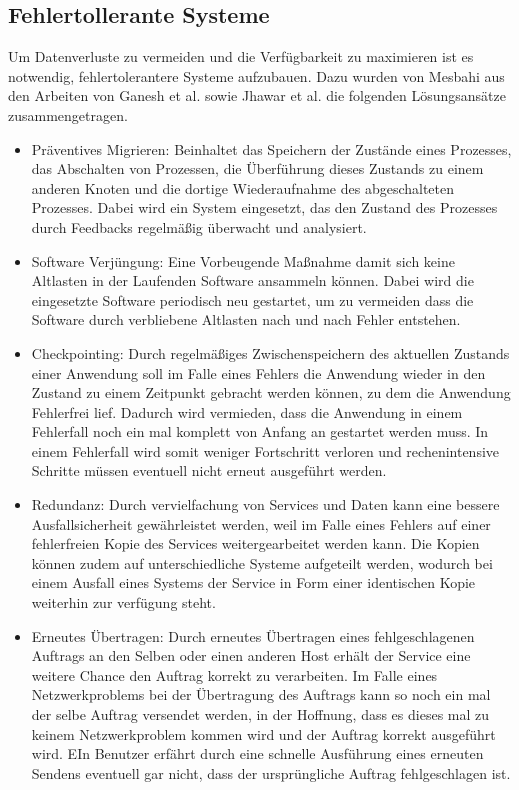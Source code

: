 \subsection{Fehlertollerante Systeme}
Um Datenverluste zu vermeiden und die Verfügbarkeit zu maximieren ist es notwendig, fehlertolerantere Systeme aufzubauen. Dazu wurden von Mesbahi \cite{mesbahi2018} aus den Arbeiten von Ganesh et al. \cite{ganesh2014} sowie Jhawar et al. \cite{jhawar2013} die folgenden Lösungsansätze zusammengetragen.

\begin{itemize}
\item
Präventives Migrieren: Beinhaltet das Speichern der Zustände eines Prozesses, das Abschalten von Prozessen, die Überführung dieses Zustands zu einem anderen Knoten und die dortige Wiederaufnahme des abgeschalteten Prozesses.
Dabei wird ein System eingesetzt, das den Zustand des Prozesses durch Feedbacks regelmäßig überwacht und analysiert. 
\item
Software Verjüngung: Eine Vorbeugende Maßnahme damit sich keine Altlasten in der Laufenden Software ansammeln können. Dabei wird die eingesetzte Software periodisch neu gestartet, um zu vermeiden dass die Software durch verbliebene Altlasten nach und nach Fehler entstehen.
\item
Checkpointing: Durch regelmäßiges Zwischenspeichern des aktuellen Zustands einer Anwendung soll im Falle eines Fehlers die Anwendung wieder in den Zustand zu einem Zeitpunkt gebracht werden können, zu dem die Anwendung Fehlerfrei lief. Dadurch wird vermieden, dass die Anwendung in einem Fehlerfall noch ein mal komplett von Anfang an gestartet werden muss. In einem Fehlerfall wird somit weniger Fortschritt verloren und rechenintensive Schritte müssen eventuell nicht erneut ausgeführt werden.
\item
Redundanz: Durch vervielfachung von Services und Daten kann eine bessere Ausfallsicherheit gewährleistet werden, weil im Falle eines Fehlers auf einer fehlerfreien Kopie des Services weitergearbeitet werden kann. Die Kopien können zudem auf unterschiedliche Systeme aufgeteilt werden, wodurch bei einem Ausfall eines Systems der Service in Form einer identischen Kopie weiterhin zur verfügung steht.
\item
Erneutes Übertragen: Durch erneutes Übertragen eines fehlgeschlagenen Auftrags an den Selben oder einen anderen Host erhält der Service eine weitere Chance den Auftrag korrekt zu verarbeiten. Im Falle eines Netzwerkproblems bei der Übertragung des Auftrags kann so noch ein mal der selbe Auftrag versendet werden, in der Hoffnung, dass es dieses mal zu keinem Netzwerkproblem kommen wird und der Auftrag korrekt ausgeführt wird. EIn Benutzer erfährt durch eine schnelle Ausführung eines erneuten Sendens eventuell gar nicht, dass der ursprüngliche Auftrag fehlgeschlagen ist.
\end{itemize}

